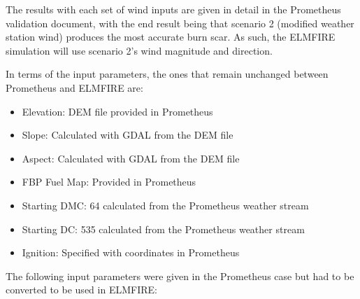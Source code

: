 The results with each set of wind inputs are given in detail in the Prometheus validation document, with the end result being that scenario 2 (modified weather station wind) produces the most accurate burn scar. As such, the ELMFIRE simulation will use scenario 2's wind magnitude and direction. 

In terms of the input parameters, the ones that remain unchanged between Prometheus and ELMFIRE are:
\begin{itemize}
    \item Elevation: DEM file provided in Prometheus
    \item Slope: Calculated with GDAL from the DEM file
    \item Aspect: Calculated with GDAL from the DEM file
    \item FBP Fuel Map: Provided in Prometheus
    \item Starting DMC: 64 calculated from the Prometheus weather stream
    \item Starting DC: 535 calculated from the Prometheus weather stream
    \item Ignition: Specified with coordinates in Prometheus
\end{itemize}

The following input parameters were given in the Prometheus case but had to be converted to be used in ELMFIRE:

